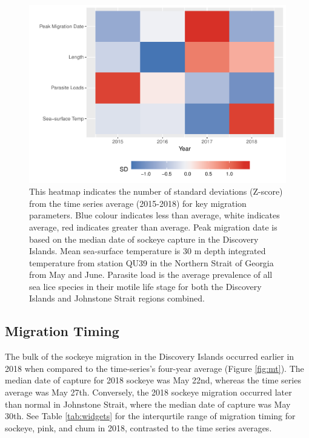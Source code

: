 \documentclass[fleqn,10pt]{wlpeerj} %
\begin{document}
\begin{figure}
\includegraphics[width=0.8\linewidth]{peer_j_migration_dynamics_files/figure-latex/heatmap-1} \caption{This heatmap indicates the number of standard deviations (Z-score) from the time series average (2015-2018) for key migration parameters. Blue colour indicates less than average, white indicates average, red indicates greater than average. Peak migration date is based on the median date of sockeye capture in the Discovery Islands.  Mean sea-surface temperature is 30 m depth integrated temperature from station QU39 in the Northern Strait of Georgia from May and June. Parasite load is the average prevalence of all sea lice species in their motile life stage for both the Discovery Islands and Johnstone Strait regions combined.}\label{fig:heatmap}
\end{figure}

\subsection*{Migration Timing}\label{migration-timing}

The bulk of the sockeye migration in the Discovery Islands occurred
earlier in 2018 when compared to the time-series's four-year average
(Figure \ref{fig:mt}). The median date of capture for 2018 sockeye was
May 22nd, whereas the time series average was May 27th. Conversely, the
2018 sockeye migration occurred later than normal in Johnstone Strait,
where the median date of capture was May 30th. See Table
\ref{tab:widgets} for the interqurtile range of migration timing for
sockeye, pink, and chum in 2018, contrasted to the time series averages.
\end{document}
